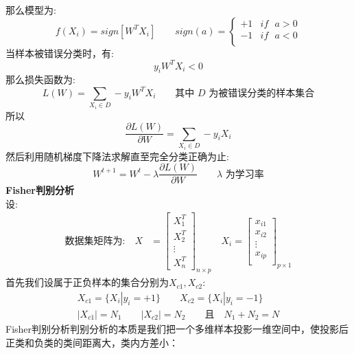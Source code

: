 \documentclass[withoutpreface,bwprint]{cumcmthesis} %
\begin{document}
	那么模型为:
	\begin{equation}
		f(X_i)=sign [W^TX_i] \quad \quad sign(a)=\begin{cases}
			+1 & \textbf{$if$ $a>0$} \\
			-1 & \textbf{$if$ $a<0$}\\
		\end{cases}	
	\end{equation}
	当样本被错误分类时，有:
	\begin{equation*}
		y_iW^TX_i<0
	\end{equation*}
	那么损失函数为:
	\begin{equation}
		L(W)=\sum_{X_i\in D} -y_iW^TX_i \quad \quad \textbf{其中 $D$ 为被错误分类的样本集合}
	\end{equation}
	所以
	\begin{equation}
		\dfrac{\partial L(W)}{\partial W}=\sum_{X_i\in D} -y_iX_i
	\end{equation}
	然后利用随机梯度下降法求解直至完全分类正确为止:
	\begin{equation}
		W^{t+1}=W^{t}-\lambda \dfrac{\partial L(W)}{\partial W} \quad \quad \textbf{$\lambda$ 为学习率}
	\end{equation}
	\textbf{Fisher判别分析}\\
	设:
	\begin{align*}
			\text{数据集矩阵为:}
		\quad
		X&=\left[
		\begin{array}{c}
			X_1^T\\
			X_2^T\\
			\vdots\\
			X_n^T
		\end{array}
		\right]_{n{\times}p}
		\quad X_i=\left[
		\begin{array}{c}
			x_{i1}\\
			x_{i2}\\
			\vdots\\
			x_{ip}\\
		\end{array}
		\right]_{p{\times}1}
	\end{align*}
	首先我们设属于正负样本的集合分别为$X_{c1},X_{c2}$:
	\begin{align*}
		X_{c1}=\{X_i|y_i=+1\} \quad\quad X_{c2}=\{X_i|y_i=-1\} \\
		|X_{c1}|=N_1 \quad\quad |X_{c2}|=N_2 \quad \quad \text{且}\quad N_1+N_2=N
	\end{align*}
	Fisher判别分析判别分析的本质是我们把一个多维样本投影一维空间中，使投影后正类和负类的类间距离大，类内方差小：\\
\end{document}
